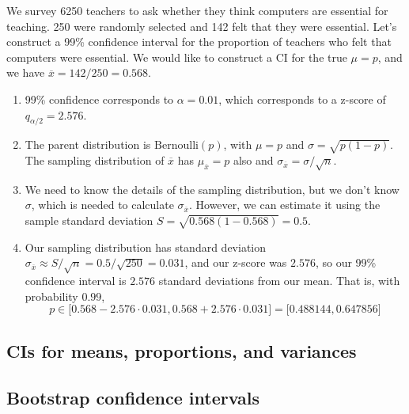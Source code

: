   \begin{example}
    We survey 6250 teachers to ask whether they think computers are essential for teaching. 250 were randomly selected and 142 felt that they were essential. Let's construct a 99\% confidence interval for the proportion of teachers who felt that computers were essential. We would like to construct a CI for the true $\mu = p$, and we have $\overline{x} = 142/250 = 0.568$. 
    \begin{enumerate}
      \item 99\% confidence corresponds to $\alpha = 0.01$, which corresponds to a z-score of $q_{\alpha/2} = 2.576$. 
      \item The parent distribution is $\mathrm{Bernoulli}(p)$, with $\mu = p$ and $\sigma = \sqrt{p (1 - p)}$. The sampling distribution of $\overline{x}$ has $\mu_{\overline{x}} = p$ also and $\sigma_{\overline{x}} = \sigma / \sqrt{n}$. 
      \item We need to know the details of the sampling distribution, but we don't know $\sigma$, which is needed to calculate $\sigma_{\overline{x}}$. However, we can estimate it using the sample standard deviation $S = \sqrt{0.568 (1 - 0.568)} = 0.5$. 
      \item Our sampling distribution has standard deviation $\sigma_{\overline{x}} \approx S / \sqrt{n} = 0.5 / \sqrt{250} = 0.031$, and our z-score was $2.576$, so our 99\% confidence interval is $2.576$ standard deviations from our mean. That is, with probability $0.99$, 
      \begin{equation}
        p \in \big[ 0.568 - 2.576 \cdot 0.031, 0.568 + 2.576 \cdot 0.031 \big] = \big[ 0.488144, 0.647856 \big]
      \end{equation}
    \end{enumerate}
  \end{example}

\subsection{CIs for means, proportions, and variances}

\subsection{Bootstrap confidence intervals}

